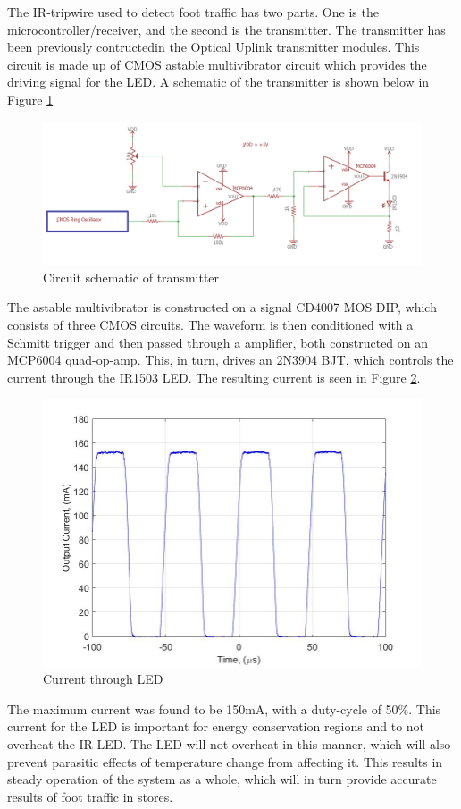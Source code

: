
The IR-tripwire used to detect foot traffic has two parts. One is the microcontroller/receiver, and the second is the transmitter. The transmitter has been previously contructedin the Optical Uplink transmitter modules. This circuit is made up of CMOS astable multivibrator circuit which provides the driving signal for the LED. A schematic of the transmitter is shown below in Figure \ref{fig:finalexperimentalschem}

\begin{figure}[H]
	\centering
	\includegraphics[width=0.7\linewidth]{Preliminary_results/FINAlexperimentalSchem}
	\caption{Circuit schematic of transmitter}
	\label{fig:finalexperimentalschem}
\end{figure}

The astable multivibrator is constructed on a signal CD4007 MOS DIP, which consists of three CMOS circuits. The waveform is then conditioned with a Schmitt trigger and then passed through a amplifier, both constructed on an MCP6004 quad-op-amp. This, in turn, drives an 2N3904 BJT, which controls the current through the IR1503 LED. The resulting current is seen in Figure \ref{fig:expcurrentlab4}.

\begin{figure}[H]
	\centering
	\includegraphics[width=0.7\linewidth]{Preliminary_results/expcurrentlab4}
	\caption{Current through LED}
	\label{fig:expcurrentlab4}
\end{figure}

The maximum current was found to be 150mA, with a duty-cycle of 50\%. This current for the LED is important for energy conservation regions and to not overheat the IR LED. The LED will not overheat in this manner, which will also prevent parasitic effects of temperature change from affecting it. This results in steady operation of the system as a whole, which will in turn provide accurate results of foot traffic in stores. 


	
